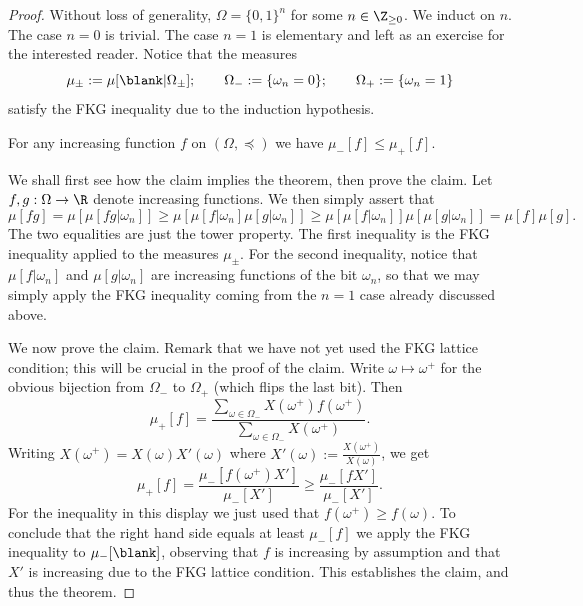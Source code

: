 \begin{proof}
    Without loss of generality, $\Omega=\{0,1\}^n$ for some $n\in\Z_{\geq 0}$.
    We induct on $n$.
    The case $n=0$ is trivial.
    The case $n=1$ is elementary and left as an exercise for the interested reader.
    Notice that the measures
    \[
        \mu_\pm:=\mu[\blank|\Omega_\pm];
        \qquad
        \Omega_-:=\{\omega_n=0\};
        \qquad
        \Omega_+:=\{\omega_n=1\}
    \]
    satisfy the FKG inequality due to the induction hypothesis.

    \begin{claim*}
        For any increasing function $f$  on $(\Omega,\preceq)$ we have \(
            \mu_-[f]\leq\mu_+[f]
        \).
    \end{claim*}

    We shall first see how the claim implies the theorem,
    then prove the claim.
    Let $f,g:\Omega\to\R$ denote increasing functions.
    We then simply assert that
    \[
        \mu[fg] = \mu[\mu[fg|\omega_n]]
        \geq
        \mu[\mu[f|\omega_n]\mu[g|\omega_n]]
        \geq
        \mu[\mu[f|\omega_n]]\mu[\mu[g|\omega_n]]
        =
        \mu[f]\mu[g].
    \]
    The two equalities are just the tower property.
    The first inequality is the FKG inequality applied
    to the measures $\mu_\pm$.
    For the second inequality, notice that $\mu[f|\omega_n]$
    and $\mu[g|\omega_n]$ are increasing functions
    of the bit $\omega_n$,
    so that we may simply apply the FKG inequality
    coming from the $n=1$ case already discussed above.

    We now prove the claim.
    Remark that we have not yet used the FKG lattice condition;
    this will be crucial in the proof of the claim.
    Write $\omega\mapsto \omega^+$ for the obvious bijection
    from $\Omega_-$ to $\Omega_+$ (which flips the last bit).
    Then
    \[
        \mu_+[ f]
        =
        \frac{\sum_{\omega\in\Omega_-}X(\omega^+)f(\omega^+)}{\sum_{\omega\in\Omega_-}X(\omega^+)}.
    \]
    Writing $X(\omega^+)=X(\omega)X'(\omega)$
    where
    $X'(\omega):=\frac{X(\omega^+)}{X(\omega)}$,
    we get
    \[
        \mu_+[ f]
        =
        \frac{\mu_-[ f(\omega^+) X']}{\mu_-[ X']}
        \geq
        \frac{\mu_-[ f X']}{\mu_-[ X']}
        .
    \]
    For the inequality in this display we just used that $f(\omega^+)\geq f(\omega)$.
    To conclude that the right hand side equals at least $\mu_-[ f]$
    we apply the FKG inequality to $\mu_-[\blank]$,
    observing that $f$ is increasing by assumption and that $X'$ is increasing
    due to the FKG lattice condition.
    This establishes the claim, and thus the theorem.
\end{proof}

